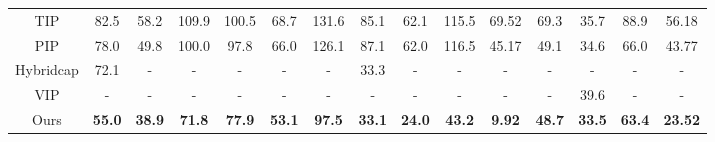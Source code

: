 \documentclass[sigconf,nonacm=true]{acmart}
\begin{document}
\begin{table*}[t]
{\begin{tabular}{c|ccc|ccc|cccc|cccc}
TIP                                          & \multicolumn{1}{c}{82.5}       & \multicolumn{1}{c}{58.2}    & \multicolumn{1}{c|}{109.9}  & \multicolumn{1}{c}{100.5}      & \multicolumn{1}{c}{68.7}          & \multicolumn{1}{c|}{131.6}  
                                             & \multicolumn{1}{c}{85.1}      & \multicolumn{1}{c}{62.1}     & \multicolumn{1}{c}{115.5}         &69.52                     & \multicolumn{1}{c}{69.3}      & \multicolumn{1}{c}{35.7}            & \multicolumn{1}{c}{88.9}   &56.18   \\ 
PIP                                          & \multicolumn{1}{c}{78.0}       & \multicolumn{1}{c}{49.8}    & \multicolumn{1}{c|}{100.0}  & \multicolumn{1}{c}{97.8}       & \multicolumn{1}{c}{66.0}          & \multicolumn{1}{c|}{126.1}    
                                             & \multicolumn{1}{c}{87.1}      & \multicolumn{1}{c}{62.0}     & \multicolumn{1}{c}{116.5}         &45.17                     & \multicolumn{1}{c}{49.1}      & \multicolumn{1}{c}{34.6}            & \multicolumn{1}{c}{66.0}   &43.77   \\
Hybridcap                                    & \multicolumn{1}{c}{72.1}       & \multicolumn{1}{c}{-}       & \multicolumn{1}{c|}{-}      & \multicolumn{1}{c}{-}          & \multicolumn{1}{c}{-}             & \multicolumn{1}{c|}{-}    
                                             & \multicolumn{1}{c}{33.3}  & \multicolumn{1}{c}{-}         & \multicolumn{1}{c}{-}    & -                   & \multicolumn{1}{c}{-}         & \multicolumn{1}{c}{-}               & \multicolumn{1}{c}{-}      & -\\
VIP                                          & \multicolumn{1}{c}{-}       & \multicolumn{1}{c}{-}       & \multicolumn{1}{c|}{-}      & \multicolumn{1}{c}{-}          & \multicolumn{1}{c}{-}             & \multicolumn{1}{c|}{-}    
                                             & \multicolumn{1}{c}{-}  & \multicolumn{1}{c}{-}         & \multicolumn{1}{c}{-}    & -                   & \multicolumn{1}{c}{-}         & \multicolumn{1}{c}{39.6}               & \multicolumn{1}{c}{-}      & -\\ 
Ours                             & \multicolumn{1}{c}{\textbf{55.0}}& \multicolumn{1}{c}{\textbf{38.9}}& \multicolumn{1}{c|}{\textbf{71.8}} & \multicolumn{1}{c}{\textbf{77.9}}& \multicolumn{1}{c}{\textbf{53.1}}& \multicolumn{1}{c|}{\textbf{97.5}}         
                    & \multicolumn{1}{c}{\textbf{33.1}}& \multicolumn{1}{c}{\textbf{24.0}}& \multicolumn{1}{c}{\textbf{43.2}}   & \textbf{9.92}       & \multicolumn{1}{c}{\textbf{48.7}}& \multicolumn{1}{c}{\textbf{33.5}} & \multicolumn{1}{c}{\textbf{63.4}}     & \textbf{23.52} \\
\hline
\end{tabular}}
\end{table*}
\end{document}
